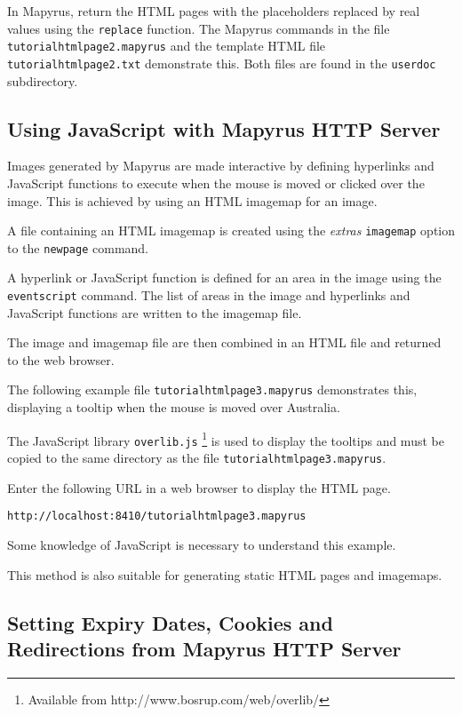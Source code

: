 In Mapyrus, return the HTML pages with the placeholders
replaced by real values using the
\texttt{replace}
function.  The Mapyrus commands in the file \texttt{tutorialhtmlpage2.mapyrus}
and the template HTML file \texttt{tutorialhtmlpage2.txt}
demonstrate this.  Both files are found in the
\texttt{userdoc} subdirectory.

\subsection{Using JavaScript with Mapyrus HTTP Server}
\label{tutorialjavascript}

Images generated by Mapyrus are made interactive by defining hyperlinks and
JavaScript functions to execute when the mouse is moved or clicked over the
image.  This is achieved by using an HTML imagemap for an image.

A file containing an HTML imagemap is created using the \textit{extras}
\texttt{imagemap} option to the \texttt{newpage} command.

A hyperlink or JavaScript function is defined for an area in the image using
the \texttt{eventscript} command.  The list of areas in the image and
hyperlinks and JavaScript functions are written to the imagemap file.

The image and imagemap file are then combined in an HTML file
and returned to the web browser.

The following example file \texttt{tutorialhtmlpage3.mapyrus}
demonstrates this, displaying a tooltip when
the mouse is moved over Australia.



The JavaScript library \texttt{overlib.js}
\footnote{Available from http://www.bosrup.com/web/overlib/} is
used to display the tooltips and must be copied to the same
directory as the file \texttt{tutorialhtmlpage3.mapyrus}.

Enter the following URL in a web browser to display the HTML page.

\begin{verbatim}
http://localhost:8410/tutorialhtmlpage3.mapyrus
\end{verbatim}

Some knowledge of JavaScript is necessary to understand this example.

This method is also suitable for generating static HTML pages
and imagemaps.

\subsection{Setting Expiry Dates, Cookies and Redirections from
Mapyrus HTTP Server}
\label{cookies}

